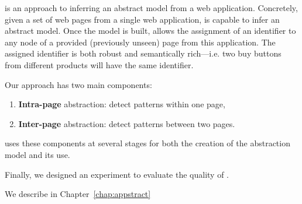 \appstract{} is an approach to inferring an abstract model from a web application.
Concretely, given a set of web pages from a single web application, \appstract{} is capable to infer an abstract model.
Once the model is built, \appstract{} allows the assignment of an identifier to any node of a provided (previously unseen) page from this application.
The assigned identifier is both robust and semantically rich---i.e. two buy buttons from different products will have the same identifier.

Our approach has two main components:
\begin{enumerate}
    \item \textbf{Intra-page} abstraction: detect patterns within one page,
    \item \textbf{Inter-page} abstraction: detect patterns between two pages. 
\end{enumerate}
\appstract{} uses these components at several stages for both the creation of the abstraction model and its use. 

Finally, we designed an experiment to evaluate the quality of \appstract{}. 

We describe \appstract{} in Chapter~\ref{chap:appstract}
